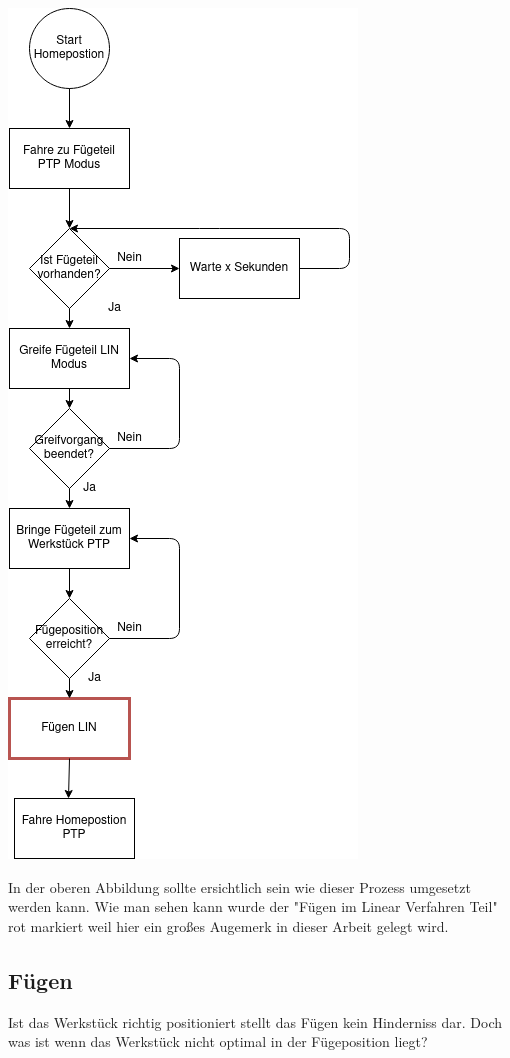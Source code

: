 \documentclass[12pt]{article}
\begin{document}
\begin{center}
\includegraphics[scale=0.60]{img/Ablauf} \\
\end{center}

In der oberen Abbildung sollte ersichtlich sein wie dieser Prozess umgesetzt werden kann. Wie man sehen
kann wurde der "Fügen im Linear Verfahren Teil" rot markiert weil hier ein großes Augemerk in dieser Arbeit gelegt wird.
\subsection{Fügen}
Ist das Werkstück richtig positioniert stellt das Fügen kein Hinderniss dar. Doch was ist wenn das Werkstück
nicht optimal in der Fügeposition liegt?
\end{document}

